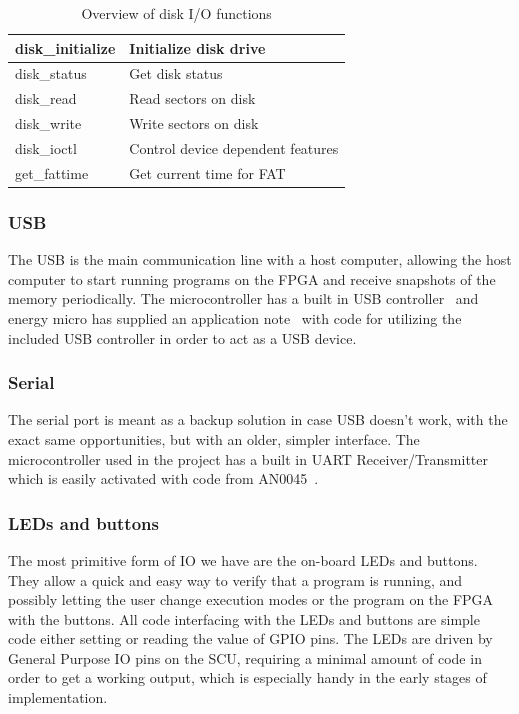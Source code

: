 \begin{table}[H]
    \begin{tabular}{| l | l |}
        \hline
        disk\_initialize & Initialize disk drive \\
        \hline
        disk\_status & Get disk status \\
        \hline
        disk\_read & Read sectors on disk \\
        \hline
        disk\_write & Write sectors on disk \\
        \hline
        disk\_ioctl & Control device dependent features \\
        \hline
        get\_fattime & Get current time for FAT \\
        \hline
    \end{tabular}
    \caption{Overview of disk I/O functions}
\end{table}

\subsubsection{USB}
The USB is the main communication line with a host computer, allowing the host computer to start running programs on the FPGA and receive snapshots of the memory periodically.
The microcontroller has a built in USB controller~\cite{efm32gg990-datasheet} and energy micro has supplied an application note~\cite{an0065} with code for utilizing the included USB controller in order to act as a USB device.

\subsubsection{Serial}
The serial port is meant as a backup solution in case USB doesn't work, with the exact same opportunities, but with an older, simpler interface.
The microcontroller used in the project has a built in UART Receiver/Transmitter\cite{efm32gg990-datasheet} which is easily activated with code from AN0045~\cite{an0045}.

\subsubsection{LEDs and buttons}
The most primitive form of IO we have are the on-board LEDs and buttons.
They allow a quick and easy way to verify that a program is running, and possibly letting the user change execution modes or the program on the FPGA with the buttons.
All code interfacing with the LEDs and buttons are simple code either setting or reading the value of GPIO pins.
The LEDs are driven by General Purpose IO pins on the SCU, requiring a minimal amount of code in order to get a working output, which is especially handy in the early stages of implementation.

